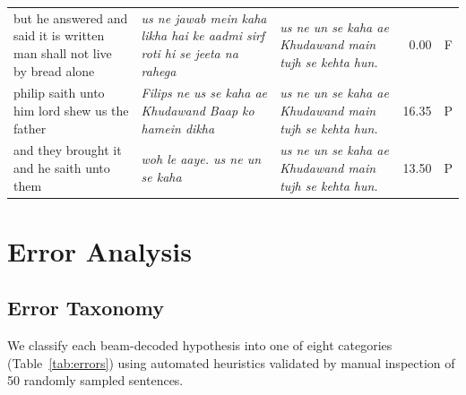 \documentclass[runningheads]{llncs}
\begin{document}
\begin{table}[H]
{\begin{tabular}{p{3.2cm} p{3.4cm} p{3.4cm} r c}
but he answered and said it is written man shall not live by bread alone
& \textit{us ne jawab mein kaha likha hai ke aadmi sirf roti hi se jeeta na rahega}
& \textit{us ne un se kaha ae Khudawand main tujh se kehta hun.}
& 0.00 & F \\[4pt]

philip saith unto him lord shew us the father
& \textit{Filips ne us se kaha ae Khudawand Baap ko hamein dikha}
& \textit{us ne un se kaha ae Khudawand main tujh se kehta hun.}
& 16.35 & P \\[4pt]

and they brought it and he saith unto them
& \textit{woh le aaye. us ne un se kaha}
& \textit{us ne un se kaha ae Khudawand main tujh se kehta hun.}
& 13.50 & P \\

\bottomrule
\end{tabular}}
\end{table}

\section{Error Analysis}
\label{sec:error}

\subsection{Error Taxonomy}

We classify each beam-decoded hypothesis into one of eight categories
(Table~\ref{tab:errors}) using automated heuristics validated by manual
inspection of 50 randomly sampled sentences.
\end{document}
